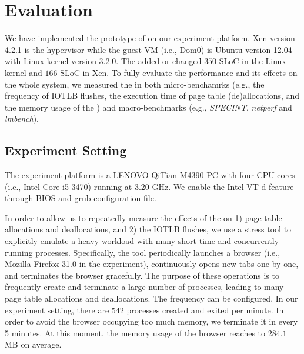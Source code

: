 \section{Evaluation} \label{sec:eva}
We have implemented the prototype of \name on our experiment platform.
Xen version 4.2.1 is the hypervisor while the guest VM (i.e., Dom0) is Ubuntu version 12.04 with Linux kernel version 3.2.0.
The \name added or changed $350$ SLoC in the Linux kernel and $166$ SLoC in Xen.
To fully evaluate the performance and its effects on the whole system, we measured the \name in both micro-benchamrks (e.g., the frequency of IOTLB flushes, the execution time of page table (de)allocations, and the memory usage of the \cache) and macro-benchmarks (e.g., \emph{SPECINT}, \emph{netperf} and \emph{lmbench}).

\subsection{Experiment Setting}
The experiment platform is a LENOVO QiTian M4390 PC with four CPU cores (i.e., Intel Core i5-3470) running at 3.20 GHz.
We enable the Intel VT-d feature through BIOS and grub configuration file. 


In order to allow us to repeatedly measure the effects of the \name on 1) page table allocations and deallocations, and 2) the IOTLB flushes, we use a stress tool to explicitly emulate a heavy workload with many short-time and concurrently-running processes.
Specifically, the tool periodically launches a browser (i.e., Mozilla Firefox 31.0 in the experiment), continuously opens new tabs one by one, and terminates the browser gracefully.
The purpose of these operations is to frequently create and terminate a large number of processes, leading to many page table allocations and deallocations.
The frequency can be configured. In our experiment setting, there are $542$ processes created and exited per minute.
In order to avoid the browser occupying too much memory, we terminate it in every 5 minutes.
At this moment, the memory usage of the browser reaches to $284.1$ MB on average.

